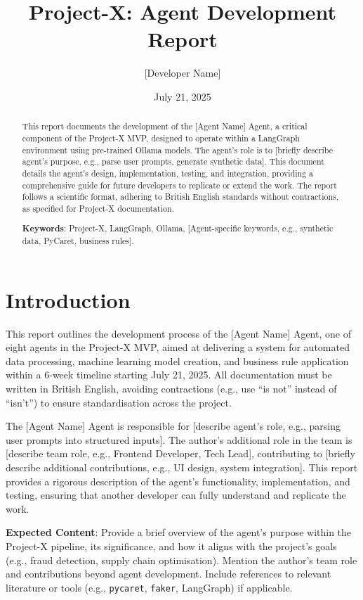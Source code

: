 \documentclass{article}
\title{Project-X: Agent Development Report}
\author{[Developer Name]}
\date{July 21, 2025}
\begin{document}
\maketitle

\begin{abstract}
This report documents the development of the [Agent Name] Agent, a critical component of the Project-X MVP, designed to operate within a LangGraph environment using pre-trained Ollama models. The agent’s role is to [briefly describe agent’s purpose, e.g., parse user prompts, generate synthetic data]. This document details the agent’s design, implementation, testing, and integration, providing a comprehensive guide for future developers to replicate or extend the work. The report follows a scientific format, adhering to British English standards without contractions, as specified for Project-X documentation.

\textbf{Keywords}: Project-X, LangGraph, Ollama, [Agent-specific keywords, e.g., synthetic data, PyCaret, business rules].
\end{abstract}

\section{Introduction}
This report outlines the development process of the [Agent Name] Agent, one of eight agents in the Project-X MVP, aimed at delivering a system for automated data processing, machine learning model creation, and business rule application within a 6-week timeline starting July 21, 2025. All documentation must be written in British English, avoiding contractions (e.g., use ``is not'' instead of ``isn't'') to ensure standardisation across the project.

The [Agent Name] Agent is responsible for [describe agent’s role, e.g., parsing user prompts into structured inputs]. The author’s additional role in the team is [describe team role, e.g., Frontend Developer, Tech Lead], contributing to [briefly describe additional contributions, e.g., UI design, system integration]. This report provides a rigorous description of the agent’s functionality, implementation, and testing, ensuring that another developer can fully understand and replicate the work.

\textbf{Expected Content}: Provide a brief overview of the agent’s purpose within the Project-X pipeline, its significance, and how it aligns with the project’s goals (e.g., fraud detection, supply chain optimisation). Mention the author’s team role and contributions beyond agent development. Include references to relevant literature or tools (e.g., \texttt{pycaret}, \texttt{faker}, LangGraph) if applicable.
\end{document}
